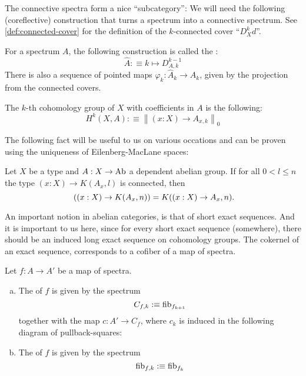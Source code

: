 The connective spectra form a nice ``subcategory'':
We will need the following (coreflective) construction that turns a spectrum into a connective spectrum.
See \cref{def:connected-cover} for the definition of the $k$-connected cover ``$D^k_Xd$''.

\begin{definition}
  For a spectrum $A$,
  the following construction is called the :
  \[ \hat{A}:\equiv k\mapsto D_{A,k}^{k-1}\]
  There is also a sequence of pointed maps $\varphi_k:\hat{A}_k\to A_k$, given by the projection from the connected covers.
\end{definition}

\begin{definition}
  The $k$-th cohomology group of $X$ with coefficients in $A$ is the following:
  \[ H^k(X,A):\equiv\left\|(x:X)\to A_{x,k}\right\|_0 \]
\end{definition}

The following fact will be useful to us on various occations and can be proven using the uniqueness of Eilenberg-MacLane spaces:

\begin{lemma}
  \label{em-comm-pi}
  Let $X$ be a type and $A:X\to\operatorname{Ab}$ a dependent abelian group.
  If for all $0<l\leq n$ the type $(x:X)\to K(A_x,l)$ is connected, then
  \[
    ((x:X)\to K(A_x,n)) = K((x:X)\to A_x,n)
    \rlap{.}
  \]
\end{lemma}

An important notion in abelian categories, is that of short exact sequences.
And it is important to us here, since for every short exact sequence (somewhere), there should be an induced long exact sequence on cohomology groups.
The cokernel of an exact sequence, corresponds to a cofiber of a map of spectra.

\begin{definition}
  Let $f:A\to A'$ be a map of spectra.
  \begin{enumerate}[(a)]
  \item The  of $f$ is given by the spectrum
    \[ C_{f,k}:\equiv \mathrm{fib}_{f_{k+1}}\]
    together with the map $c:A'\to C_f$, where $c_k$ is induced in the following diagram of pullback-squares:
    \begin{center}
    \end{center}
  \item The  of $f$ is given by the spectrum
    \[ \mathrm{fib}_{f,k}:\equiv \mathrm{fib}_{f_k}\]
  \end{enumerate}
\end{definition}

